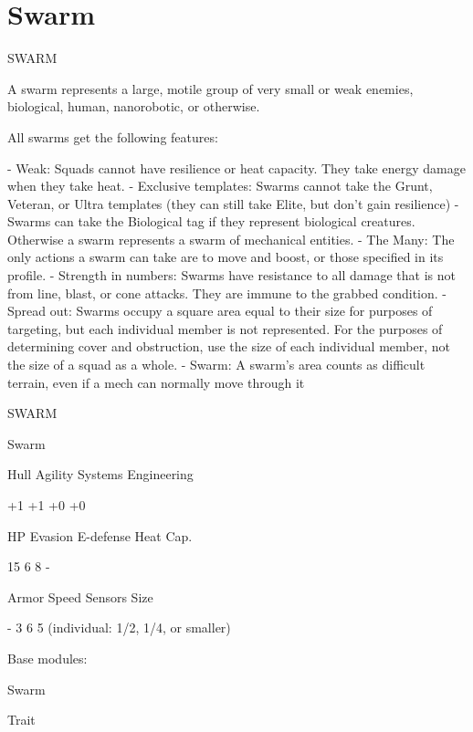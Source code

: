 \section{Swarm}
                                                   SWARM

A swarm represents a large, motile group of very small or weak enemies, biological, human,
nanorobotic, or otherwise.

All swarms get the following features:

    -    Weak: Squads cannot have resilience or heat capacity. They take energy damage when
         they take heat.
    -    Exclusive templates: Swarms cannot take the Grunt, Veteran, or Ultra templates (they
         can still take Elite, but don’t gain resilience)
    -    Swarms can take the Biological tag if they represent biological creatures. Otherwise a
         swarm represents a swarm of mechanical entities.
    -    The Many: The only actions a swarm can take are to move and boost, or those specified
         in its profile.
    -    Strength in numbers: Swarms have resistance to all damage that is not from line, blast,
         or cone attacks. They are immune to the grabbed condition.
    -    Spread out: Swarms occupy a square area equal to their size for purposes of targeting,
         but each individual member is not represented. For the purposes of determining cover
         and obstruction, use the size of each individual member, not the size of a squad as a
         whole.
    -    Swarm: A swarm’s area counts as difficult terrain, even if a mech can normally move
         through it

       SWARM

       Swarm

       Hull       Agility      Systems       Engineering

       +1         +1           +0            +0

       HP         Evasion      E-defense     Heat Cap.

       15         6            8             -

       Armor      Speed        Sensors       Size

       -          3            6             5 (individual:
                                             1/2, 1/4, or
                                             smaller)

Base modules:

Swarm

Trait

